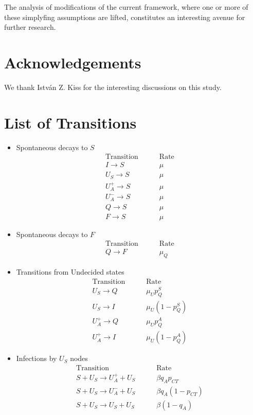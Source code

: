 \documentclass[aps,twocolumn,superscriptaddress,nofootinbib,pre,floatfix]{revtex4-1}
\begin{document}
The analysis of modifications of the current framework, where one or
more of these simplyfing assumptions are lifted,
constitutes an interesting avenue for further research.

\section{Acknowledgements}
We thank Istv\'an Z. Kiss for the interesting discussions on this study. 

\newpage

\appendix

\section{List of Transitions}
\label{Model}
\begin{itemize}
\item
  Spontaneous decays to $S$
  \begin{eqnarray} \nonumber
   \textrm{Transition} & ~~~~~~ & \textrm{Rate} \\ \nonumber
  I \to S & & \mu\\ \nonumber
  U_S \to S & &\mu\\ \nonumber
  U_A^+ \to S & &\mu\\ \nonumber
  U_A^- \to S & &\mu\\ \nonumber
  Q \to S & &\mu\\ \nonumber
  F \to S & &\mu 
\end{eqnarray}

\item
  Spontaneous decays to $F$
  \begin{eqnarray} \nonumber
    \textrm{Transition} & ~~~~~~ & \textrm{Rate} \\ \nonumber
    Q \to F & &\mu_Q
\end{eqnarray}

\item
  Transitions from Undecided states
  \begin{eqnarray} \nonumber
    \textrm{Transition} & ~~~~~~ & \textrm{Rate} \\ \nonumber
    U_S \to Q & &\mu_U p_Q^S \\ \nonumber
    U_S \to I & &\mu_U (1-p_Q^S) \\ \nonumber
    U_A^+ \to Q & &\mu_U p_Q^A \\ \nonumber
    U_A^+ \to I & &\mu_U (1-p_Q^A)
\end{eqnarray}

\item
  Infections by $U_S$ nodes
  \begin{eqnarray} \nonumber
    \textrm{Transition} & ~~~~~~ & \textrm{Rate} \\ \nonumber
    S+U_S \to U_A^++U_S & &\beta q_A p_{CT} \\ \nonumber
    S+U_S \to U_A^-+U_S & &\beta q_A (1-p_{CT}) \\ \nonumber
    S+U_S \to U_S + U_S & &\beta (1-q_A)
\end{eqnarray}


\end{itemize}
\end{document}
